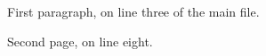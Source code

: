 \documentclass{article}
\begin{document}
First paragraph, on line three of the main file.



\newpage
Second page, on line eight.
\end{document}
